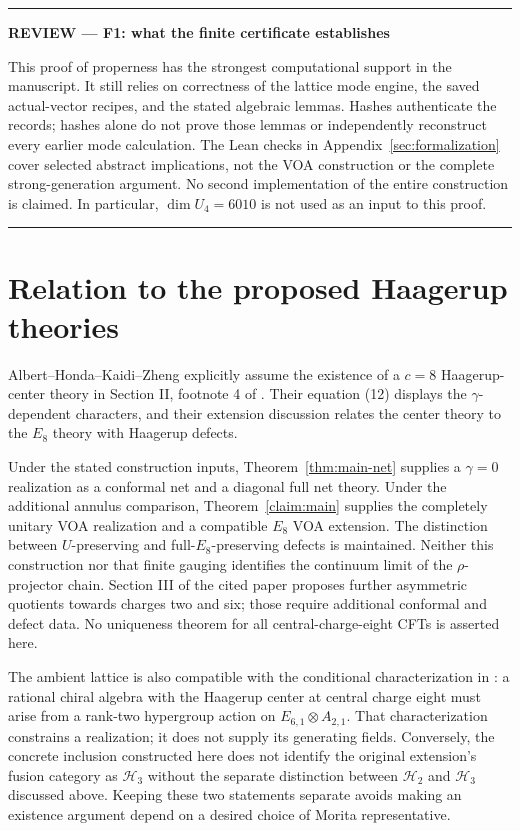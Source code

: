 \documentclass[11pt,a4paper]{article}
\theoremstyle{definition}
\newcommand{\HH}{\mathcal H}
\newenvironment{reviewnote}[1]{\par\addvspace{8pt}\begingroup
  \color{Sepia}\noindent\rule{\linewidth}{0.7pt}\par\nobreak
  \noindent\textbf{REVIEW --- #1}\par\nobreak\small\noindent\ignorespaces
}{\par\noindent\rule{\linewidth}{0.7pt}\par\endgroup\addvspace{8pt}}
\begin{document}
\begin{reviewnote}{F1: what the finite certificate establishes}
This proof of properness has the strongest computational support in the
manuscript. It still relies on correctness of the lattice mode engine,
the saved actual-vector recipes, and the stated algebraic lemmas.
Hashes authenticate the records; hashes alone do not prove those lemmas
or independently reconstruct every earlier mode calculation. The Lean
checks in Appendix~\ref{sec:formalization} cover selected abstract
implications, not the VOA construction or the complete strong-generation
argument. No second implementation of the entire construction is
claimed. In particular, \(\dim U_4=6010\) is not used as an input to
this proof.
\end{reviewnote}




\section{Relation to the proposed Haagerup theories}\label{sec:comparison}
Albert--Honda--Kaidi--Zheng explicitly assume the existence of a
\(c=8\) Haagerup-center theory in Section II, footnote 4 of
\cite{AHKZ}.
Their equation (12) displays the \(\gamma\)-dependent characters,
and their extension discussion relates the center theory to the
\(E_8\) theory with Haagerup defects.

Under the stated construction inputs, Theorem~\ref{thm:main-net}
supplies a $\gamma=0$ realization as a conformal net and a diagonal
full net theory. Under the additional annulus comparison,
Theorem~\ref{claim:main} supplies the completely unitary VOA
realization and a compatible $E_8$ VOA extension. The distinction
between $U$-preserving and full-$E_8$-preserving defects is maintained.
Neither this construction
nor that finite gauging identifies the continuum limit of the
\(\rho\)-projector chain. Section III of the cited paper proposes
further asymmetric quotients towards charges two and six; those require
additional conformal and defect data. No uniqueness theorem for all
central-charge-eight CFTs is asserted here.

The ambient lattice is also compatible with the conditional
characterization in \cite[Section 4.3]{GR}: a rational chiral algebra
with the Haagerup center at central charge eight must arise from a
rank-two hypergroup action on $E_{6,1}\otimes A_{2,1}$. That
characterization constrains a realization; it does not supply its
generating fields. Conversely, the concrete inclusion constructed here
does not identify the original extension's fusion category as $\HH_3$
without the separate distinction between $\HH_2$ and $\HH_3$ discussed
above. Keeping these two statements separate avoids making an
existence argument depend on a desired choice of Morita representative.
\end{document}
